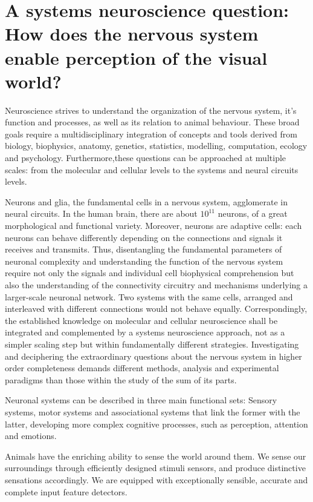 \section{A systems neuroscience question: How does the nervous system enable perception of the visual world?}
\label{sec:int_motivation}

Neuroscience strives to understand the organization of the nervous system, it's function and processes, as well as its relation to animal behaviour. These broad goals require a multidisciplinary integration of concepts and tools derived from biology, biophysics, anatomy, genetics, statistics, modelling, computation, ecology and psychology. Furthermore,these questions can be approached at multiple scales: from the molecular and cellular levels to the systems and neural circuits levels.

Neurons and glia, the fundamental cells in a nervous system, agglomerate in neural circuits. In the human brain, there are about $10^{11}$ neurons, of a great morphological and functional variety. Moreover, neurons are adaptive cells: each neurons can behave differently depending on the connections and signals it receives and transmits. 
Thus, disentangling the fundamental parameters of neuronal complexity and understanding the function of the nervous system require not only the signals and individual cell biophysical comprehension but also the understanding of the connectivity circuitry and mechanisms underlying a larger-scale neuronal network. Two systems with the same cells, arranged and interleaved with different connections would not behave equally. Correspondingly, the established knowledge on molecular and cellular neuroscience shall be integrated and complemented by a systems neuroscience approach, not as a simpler scaling step but within fundamentally different strategies. Investigating and deciphering the extraordinary questions about the nervous system in higher order completeness demands different methods, analysis and experimental paradigms than those within the study of the sum of its parts.

Neuronal systems can be described in three main functional sets: Sensory systems, motor systems and associational systems that link the former with the latter, developing more complex cognitive processes, such as perception, attention and emotions.

Animals have the enriching ability to sense the world around them. We sense our surroundings through efficiently designed stimuli sensors, and produce distinctive sensations accordingly. We are equipped with exceptionally sensible, accurate and complete input feature detectors.

